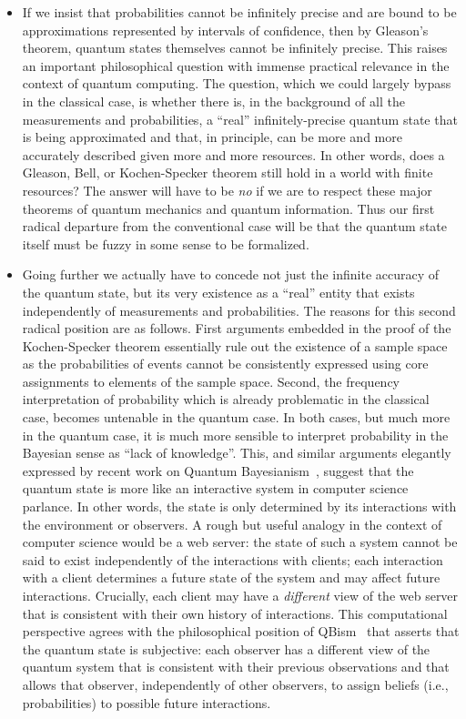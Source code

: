 \documentclass{article}
\theoremstyle{remark}
\begin{document}
\begin{itemize}

\item If we insist that probabilities cannot be infinitely precise and
  are bound to be approximations represented by intervals of
  confidence, then by Gleason's theorem, quantum states themselves
  cannot be infinitely precise. This raises an important philosophical
  question with immense practical relevance in the context of quantum
  computing. The question, which we could largely bypass in the
  classical case, is whether there is, in the background of all the
  measurements and probabilities, a ``real'' infinitely-precise
  quantum state that is being approximated and that, in principle, can
  be more and more accurately described given more and more
  resources. In other words, does a Gleason, Bell, or Kochen-Specker
  theorem still hold in a world with finite resources?  The answer
  will have to be \emph{no} if we are to respect these major theorems
  of quantum mechanics and quantum information. Thus our first radical
  departure from the conventional case will be that the quantum state
  itself must be fuzzy in some sense to be formalized.

\item Going further we actually have to concede not just the infinite
  accuracy of the quantum state, but its very existence as a ``real''
  entity that exists independently of measurements and
  probabilities. The reasons for this second radical position are as
  follows. First arguments embedded in the proof of the Kochen-Specker
  theorem essentially rule out the existence of a sample space as the
  probabilities of events cannot be consistently expressed using core
  assignments to elements of the sample space. Second, the frequency
  interpretation of probability which is already problematic in the
  classical case, becomes untenable in the quantum case. In both
  cases, but much more in the quantum case, it is much more sensible
  to interpret probability in the Bayesian sense as ``lack of
  knowledge''. This, and similar arguments elegantly expressed by
  recent work on Quantum Bayesianism~\cite{Fuchs2010,VonBaeyer2016},
  suggest that the quantum state is more like an interactive system in
  computer science parlance. In other words, the state is only
  determined by its interactions with the environment or observers. A
  rough but useful analogy in the context of computer science would be
  a web server: the state of such a system cannot be said to exist
  independently of the interactions with clients; each interaction
  with a client determines a future state of the system and may affect
  future interactions. Crucially, each client may have a
  \emph{different} view of the web server that is consistent with
  their own history of interactions. This computational perspective
  agrees with the philosophical position of QBism~\cite{VonBaeyer2016}
  that asserts that the quantum state is subjective: each observer has
  a different view of the quantum system that is consistent with their
  previous observations and that allows that observer, independently
  of other observers, to assign beliefs (i.e., probabilities) to
  possible future interactions.


\end{itemize}
\end{document}
